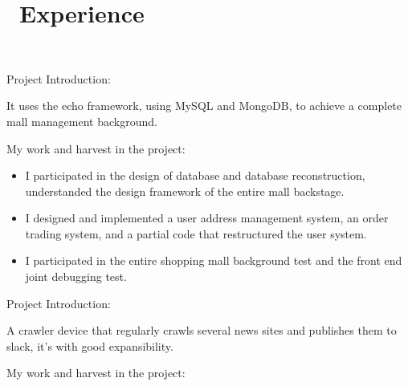 \documentclass{resume}
\begin{document}
\section{\faUsers\ Experience} \vspace{1mm}

\faLink\ 

\vspace{1mm}\par
\noindent
Project Introduction:

\vspace{1mm}\par
\setlength{\parindent}{2ex}
It uses the echo framework, using MySQL and MongoDB, to achieve a complete mall
 management background.

\vspace{1mm}\par
\noindent
My work and harvest in the project:

\begin{itemize}[parsep=1ex]
  \item I participated in the design of database and database reconstruction,
   understanded the design framework of the entire mall backstage.
  \item I designed and implemented a user address management system, an order
   trading system, and a partial code that restructured the user system.
  \item I participated in the entire shopping mall background test and the front
   end joint debugging test.
\end{itemize}


\vspace{1mm}\par
\noindent
Project Introduction:

\vspace{1mm}\par
\setlength{\parindent}{2ex}
A crawler device that regularly crawls several news sites and publishes them to slack,
 it's with good expansibility.

\vspace{1mm}\par
\noindent
My work and harvest in the project:
\end{document}
